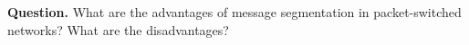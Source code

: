 \textbf{Question.} What are the advantages of message segmentation in
packet-switched networks? What are the disadvantages?
